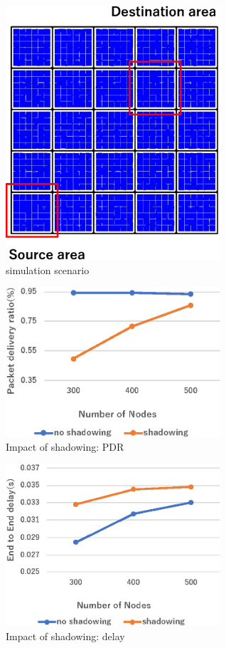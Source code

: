 \documentclass[conference]{IEEEtran}
\begin{document}
\begin{figure}[!ht]
\centering
\includegraphics[width=80mm]{figures/scenario.eps}
\caption{simulation scenario }
\label{fig:scenario}
\end{figure}

\begin{figure}[!ht]
\centering
\includegraphics[width=80mm]{figures/LSGO_PDR.eps}
\caption{Impact of shadowing: PDR }
\label{fig:LSGO-PDR}
\end{figure}

\begin{figure}[!ht]
\centering
\includegraphics[width=80mm]{figures/LSGO_delay.eps}
\caption{Impact of shadowing: delay}
\label{fig:LSGO-delay}
\end{figure}
\end{document}
